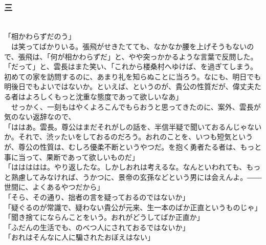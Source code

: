 \documentclass[
  paper=a5,
  fontsize=10pt,
  jafontsize=9.5pt,
  tate,                  %
  open_bracket_pos=nibu, %
]{jlreq}
\begin{document}
\\

\subsubsection{三}

\\


「相かわらずだのう」\\


　は笑ってばかりいる。張飛がせきたてても、なかなか腰を上げそうもないので、張飛は、「何が相かわらずだ」と、やや突っかかるような言葉で反問した。\\


「だって」と、雲長はまた笑い、「これから楼桑村へゆけば、を過ぎてしまう。初めての家を訪問するのに、あまり礼を知らぬことに当ろう。なにも、明日でも明後日でもよいではないか。といえば、というのが、貴公の性質だが、偉丈夫たる者はよろしくもっと沈重な態度であって欲しいなあ」\\


　せっかく、一刻もはやくよろこんでもらおうと思ってきたのに、案外、雲長が気のない返辞なので、\\


「ははあ。雲長。尊公はまだそれがしの話を、半信半疑で聞いておるんじゃないか。それで、渋ッたいをしておるのだろう。おれのことを、いつも短気というが、尊公の性質は、むしろ優柔不断というやつだ。を抱く勇者たる者は、もっと事に当って、果断であって欲しいものだ」\\


「ははははは。やり返したな。しかしおれは考えるな。なんといわれても、もっと熟慮してみなければ、うかつに、景帝の玄孫などという男には会えんよ。――世間に、よくあるやつだから」\\


「そら、その通り、拙者の言を疑っておるのではないか」\\


「疑ぐるのが常識で、疑わない貴公が元来、生一本のばか正直というものじゃ」\\


「聞き捨てにならんことをいう。おれがどうしてばか正直か」\\


「ふだんの生活でも、のべつ人にされておるではないか」\\


「おれはそんなに人に騙されたおぼえはない」\\
\end{document}
